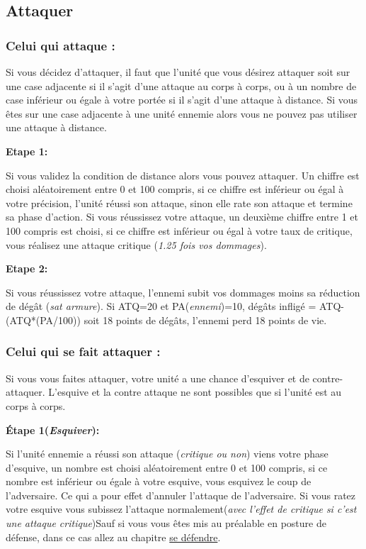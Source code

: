 \documentclass[a4paper]{article}
\begin{document}
	\subsection{Attaquer}

	\subsubsection{Celui qui attaque :}	
	
	\quad Si vous décidez d'attaquer, il faut que l'unité que vous désirez attaquer soit sur une case adjacente si il s'agit d'une attaque au corps à corps, ou à un nombre de case inférieur ou égale à votre portée si il s'agit d'une attaque à distance. Si vous êtes sur une case adjacente à une unité ennemie alors vous ne pouvez pas utiliser une attaque à distance.

	\quad \textbf{Etape 1: }	
	
	\quad Si vous validez la condition de distance alors vous pouvez attaquer. Un chiffre est choisi aléatoirement entre 0 et 100 compris, si ce chiffre est inférieur ou égal à votre précision, l'unité réussi son attaque, sinon elle rate son attaque et termine sa phase d'action. Si vous réussissez votre attaque, un deuxième chiffre entre 1 et 100 compris est choisi, si ce chiffre est inférieur ou égal à votre taux de critique, vous réalisez une attaque critique (\textit{1.25 fois vos dommages}).
	
	\quad \textbf{Etape 2: }
	
	\quad Si vous réussissez votre attaque, l'ennemi subit vos dommages moins sa réduction de dégât (\textit{sat armure}). Si ATQ=20 et PA(\textit{ennemi})=10, dégâts infligé = ATQ-(ATQ*(PA/100)) soit 18 points de dégâts, l'ennemi perd 18 points de vie.
	
	\subsubsection{Celui qui se fait attaquer :}
	
	\quad Si vous vous faites attaquer, votre unité a une chance d'esquiver et de contre-attaquer. L'esquive et la contre attaque ne sont possibles que si l'unité est au corps à corps.
	
	\quad \textbf{Étape 1(\textit{Esquiver}):}
	
	\quad Si l'unité ennemie a réussi son attaque (\textit{critique ou non}) viens votre phase d'esquive, un nombre est choisi aléatoirement entre 0 et 100 compris, si ce nombre est inférieur ou égale à votre esquive, vous esquivez le coup de l'adversaire. Ce qui a pour effet d'annuler l'attaque de l'adversaire. Si vous ratez votre esquive vous subissez l'attaque normalement(\textit{avec l'effet de critique si c'est une attaque critique})Sauf si vous vous êtes mis au préalable en posture de défense, dans ce cas allez au chapitre \underline{se défendre}.
	
\end{document}
